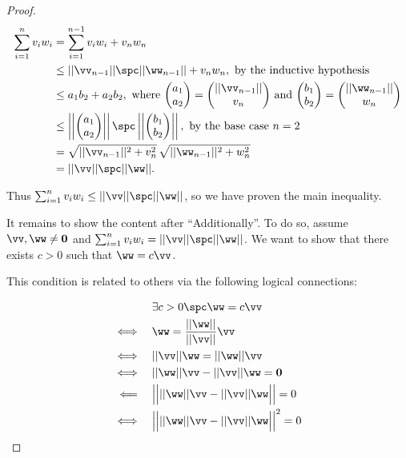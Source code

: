 \begin{proof}
{		\begin{align*}
			\sum_{i = 1}^n v_i w_i &= \sum_{i = 1}^{n - 1} v_i w_i + v_n w_n \\
			&\leq ||\vv_{n - 1}|| \spc ||\ww_{n - 1}|| + v_n w_n, \text{ by the inductive hypothesis} \\
			&\leq a_1 b_2 + a_2 b_2, \text{ where $\begin{pmatrix} a_1 \\ a_2 \end{pmatrix} = \begin{pmatrix} ||\vv_{n - 1}|| \\ v_n \end{pmatrix}$ and $\begin{pmatrix} b_1 \\ b_2 \end{pmatrix} = \begin{pmatrix} ||\ww_{n - 1}|| \\ w_n \end{pmatrix}$} \\
			&\leq \left|\left|\begin{pmatrix} a_1 \\ a_2 \end{pmatrix}\right|\right| \spc \left|\left|\begin{pmatrix} b_1 \\ b_2 \end{pmatrix}\right|\right|, \text{ by the base case $n = 2$} \\
			&= \sqrt{||\vv_{n - 1}||^2 + v_n^2} \, \sqrt{||\ww_{n - 1}||^2 + w_n^2} \\
			&= ||\vv|| \spc ||\ww||.
		\end{align*}
	}
	
	Thus $\sum_{i = 1}^n v_i w_i \leq ||\vv|| \spc ||\ww||$, so we have proven the main inequality. 
	
	It remains to show the content after ``Additionally''. To do so, assume $\vv, \ww \neq \mathbf{0}$ and $\sum_{i = 1}^n v_i w_i = ||\vv|| \spc ||\ww||$. We want to show that there exists $c > 0$ such that $\ww = c\vv$. 
	
	This condition is related to others via the following logical connections:
	
	\begin{alignat*}{1}
		& \exists c > 0 \spc \ww = c\vv \\
		\iff\quad & \ww = \frac{||\ww||}{||\vv||} \vv \\
		\iff\quad & ||\vv||\ww = ||\ww||\vv \\
		\iff\quad & ||\ww||\vv - ||\vv||\ww = \mathbf{0} \\
		\impliedby\quad & \Big|\Big| ||\ww||\vv - ||\vv||\ww \Big|\Big| = 0 \\
		\iff\quad & \Big|\Big| ||\ww||\vv - ||\vv||\ww \Big|\Big|^2 = 0
	\end{alignat*}
	

\end{proof}
